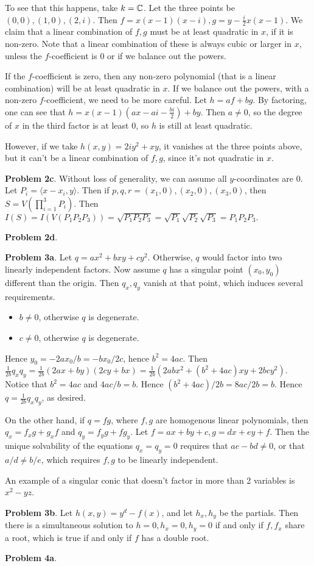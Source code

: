 To see that this happens, take $k = \mathbb{C}$. Let the three points be $(0, 0), (1, 0), (2, i)$. Then $f = x (x - 1)(x - i), g = y - \frac{i}{2} x(x - 1)$. We claim that a linear combination of $f, g$ must be at least quadratic in $x$, if it is non-zero. Note that a linear combination of these is always cubic or larger in $x$, unless the $f$-coefficient is $0$ or if we balance out the powers.

If the $f$-coefficient is zero, then any non-zero polynomial (that is a linear combination) will be at least quadratic in $x$. If we balance out the powers, with a non-zero $f$-coefficient, we need to be more careful. Let $h = af + bg$. By factoring, one can see that $h = x(x - 1)(ax - ai - \frac{bi}{2}) + by.$ Then $a \neq 0$, so the degree of $x$ in the third factor is at least 0, so $h$ is still at least quadratic. 

However, if we take $h(x,y) = 2iy^2 + xy$, it vanishes at the three points above, but it can't be a linear combination of $f, g$, since it's not quadratic in $x$.

\noindent\textbf{Problem 2c}. Without loss of generality, we can assume all $y$-coordinates are 0. Let $P_i = \langle x - x_i, y \rangle.$ Then if $p, q, r = (x_1, 0), (x_2, 0), (x_3, 0)$, then $S = V(\prod_{i = 1}^3 P_i).$ Then $I(S) = I(V(P_1 P_2 P_3)) = \sqrt{P_1 P_2 P_3} = \sqrt {P_1} \sqrt {P_2} \sqrt {P_3} = P_1 P_2 P_3.$

\noindent\textbf{Problem 2d}.

\newpage
\noindent\textbf{Problem 3a}. Let $q = ax^2 + bxy + cy^2$. Otherwise, $q$ would factor into two linearly independent factors. Now assume $q$ has a singular point $(x_0, y_0)$ different than the origin. Then $q_x, q_y$ vanish at that point, which induces several requirements.
\begin{itemize}
\item $b \neq 0$, otherwise $q$ is degenerate.
\item $c \neq 0$, otherwise $q$ is degenerate.
\end{itemize}
Hence $y_0 = -2ax_0/b = -bx_0/2c$, hence $b^2 = 4ac$. Then $\frac{1}{2b} q_x q_y = \frac{1}{2b} (2ax + by) (2cy + bx) = \frac{1}{2b} (2abx^2 + (b^2 + 4ac)xy + 2bcy^2).$ Notice that $b^2 = 4ac$ and $4ac/b = b$. Hence $(b^2 + 4ac)/2b = 8ac/2b = b$. Hence $q = \frac{1}{2b} q_x q_y$, as desired.

On the other hand, if $q = fg$, where $f, g$ are homogenous linear polynomials, then $q_x = f_x g + g_x f$ and $q_y = f_y g + f g_y$. Let $f = ax + by + c, g = dx + ey + f$. Then the unique solvability of the equations $q_x = q_y = 0$ requires that $ae - bd \neq 0$, or that $a/d \neq b/e$, which requires $f, g$ to be linearly independent.

An example of a singular conic that doesn't factor in more than 2 variables is $x^2 - yz$.

\noindent\textbf{Problem 3b}. Let $h(x,y) = y^d - f(x)$, and let $h_x, h_y$ be the partials. Then there is a simultaneous solution to $h = 0, h_x = 0, h_y = 0$ if and only if $f, f_x$ share a root, which is true if and only if $f$ has a double root.

\noindent\textbf{Problem 4a}.
